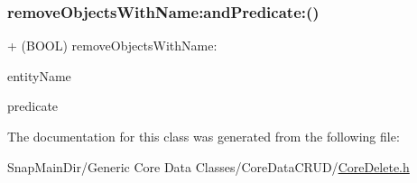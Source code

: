 \hypertarget{interface_core_delete_a7ffa2b9844f49876942e80f83eea579f}{}\label{interface_core_delete_a7ffa2b9844f49876942e80f83eea579f} 
\subsubsection{\texorpdfstring{remove\+Objects\+With\+Name\+:and\+Predicate\+:()}{removeObjectsWithName:andPredicate:()}}
{\footnotesize\ttfamily + (B\+O\+OL) remove\+Objects\+With\+Name\+: \begin{DoxyParamCaption}\item[{(N\+S\+String $\ast$)}]{entity\+Name }\item[{andPredicate:(N\+S\+Predicate $\ast$)}]{predicate }\end{DoxyParamCaption}}



The documentation for this class was generated from the following file\+:\begin{DoxyCompactItemize}
\item 
Snap\+Main\+Dir/\+Generic Core Data Classes/\+Core\+Data\+C\+R\+U\+D/\hyperlink{_core_delete_8h}{Core\+Delete.\+h}\end{DoxyCompactItemize}
